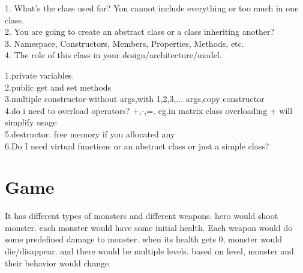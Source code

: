 1. What's the class used for? You cannot include everything or too much in one class. \\
2. You are going to create an abstract class or a class inheriting another? \\
3. Namespace, Constructors, Members, Properties, Methods, etc. \\
4. The role of this class in your design/architecture/model. 

1.private variables. \\
2.public get and set methods  \\
3.multiple constructor-without args,with 1,2,3,... args,copy constructor \\
4.do i need to overload operators? +,-,=. eg.in matrix class overloading + will simplify usage \\
5.destructor. free memory if you allocated any \\
6.Do I need virtual functions or an abstract class or just a simple class?

\section{Game}
It has different types of monsters and different weapons. hero would shoot monster. each monster would have some initial health. Each weapon would do some predefined damage to 
monster. when its health gets 0, monster would die/disappear. and there would be multiple levels. based on level, monster and their behavior would change.

